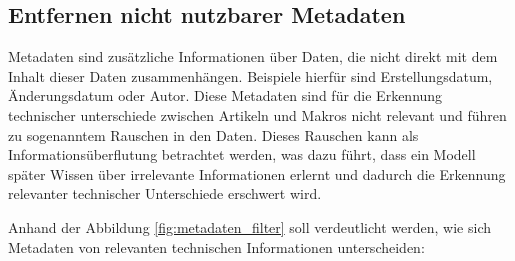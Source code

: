 \subsection{Entfernen nicht nutzbarer Metadaten}

Metadaten sind zusätzliche Informationen über Daten, die nicht direkt mit dem Inhalt dieser Daten zusammenhängen. Beispiele hierfür sind Erstellungsdatum, Änderungsdatum oder Autor. 
Diese Metadaten sind für die Erkennung technischer unterschiede zwischen Artikeln und Makros nicht relevant und führen zu sogenanntem Rauschen in den Daten. 
Dieses Rauschen kann als Informationsüberflutung betrachtet werden, was dazu führt, dass ein Modell später Wissen über irrelevante Informationen erlernt und dadurch die Erkennung relevanter technischer Unterschiede erschwert wird.

Anhand der Abbildung \ref{fig:metadaten_filter} soll verdeutlicht werden, wie sich Metadaten von relevanten technischen Informationen unterscheiden:

